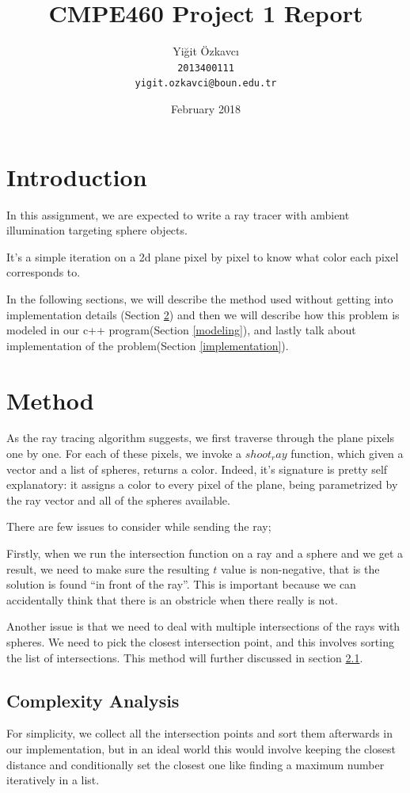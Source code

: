 \documentclass{article}
\title{CMPE460 Project 1 Report}
\author{
  Yiğit Özkavcı \\
  \texttt{2013400111} \\
  \texttt{yigit.ozkavci@boun.edu.tr}
}
\date{February 2018}
\begin{document}
\maketitle

\tableofcontents

\section{Introduction}
In this assignment, we are expected to write a ray tracer with ambient illumination targeting sphere objects.

It's a simple iteration on a 2d plane pixel by pixel to know what color each pixel corresponds to.

In the following sections, we will describe the method used without getting into implementation details (Section \ref{method}) and then we will describe how this problem is modeled in our c++ program(Section \ref{modeling}), and lastly talk about implementation of the problem(Section \ref{implementation}).

\section{Method}
\label{method}
\par As the ray tracing algorithm suggests, we first traverse through the plane pixels one by one. For each of these pixels, we invoke a $shoot_ray$ function, which given a vector and a list of spheres, returns a color. Indeed, it's signature is pretty self explanatory: it assigns a color to every pixel of the plane, being parametrized by the ray vector and all of the spheres available.

There are few issues to consider while sending the ray;
\par Firstly, when we run the intersection function on a ray and a sphere and we get a result, we need to make sure the resulting $t$ value is non-negative, that is the solution is found ``in front of the ray''. This is important because we can accidentally think that there is an obstricle when there really is not.

\par Another issue is that we need to deal with multiple intersections of the rays with spheres. We need to pick the closest intersection point, and this involves sorting the list of intersections. This method will further discussed in section \ref{complexity}.

\subsection{Complexity Analysis}
\label{complexity}
For simplicity, we collect all the intersection points and sort them afterwards in our implementation, but in an ideal world this would involve keeping the closest distance and conditionally set the closest one like finding a maximum number iteratively in a list.
\end{document}
